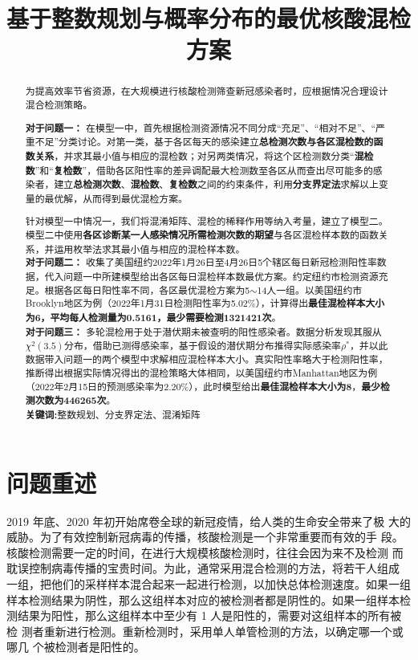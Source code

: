 \documentclass[withoutpreface,bwprint]{cumcmthesis} %
\title{基于整数规划与概率分布的最优核酸混检方案}
\begin{document}
\maketitle
\begin{abstract}

为提高效率节省资源，在大规模进行核酸检测筛查新冠感染者时，应根据情况合理设计混合检测策略。

\textbf{对于问题一：}
在模型一中，首先根据检测资源情况不同分成“充足”、“相对不足”、“严重不足”分类讨论。对第一类，基于各区每天的感染建立\textbf{总检测次数与各区混检数的函数关系}，并求其最小值与相应的混检数；对另两类情况，将这个区检测数分类“\textbf{混检数}”和“\textbf{复检数}”，借助各区阳性率的差异调配最大检测数至各区从而查出尽可能多的感染者，建立\textbf{总检测次数}、\textbf{混检数}、\textbf{复检数}之间的约束条件，利用\textbf{分支界定法}求解以上变量的最优解，从而得到最优混检方案。 

针对模型一中情况一，我们将混淆矩阵、混检的稀释作用等纳入考量，建立了模型二。模型二中使用\textbf{各区诊断某一人感染情况所需检测次数的期望}与各区混检样本数的函数关系，并运用枚举法求其最小值与相应的混检样本数。\\

\textbf{对于问题二：} 
收集了美国纽约2022年1月26日至4月26日5个辖区每日新冠检测阳性率数据，代入问题一中所建模型给出各区每日混检样本数最优方案。约定纽约市检测资源充足。根据各区每日阳性率不同，各区最优混检方案为5$\sim$14人一组。以美国纽约市Brooklyn地区为例（2022年1月31日检测阳性率为5.02\%），计算得出\textbf{最佳混检样本大小为6，平均每人检测量为0.5161，最少需要检测1321421次}。\\

\textbf{对于问题三：} 
多轮混检用于处于潜伏期未被查明的阳性感染者。数据分析发现其服从$ \chi^2  \left(3.5\right)$分布\cite{wuhan}，借助已测得感染率，基于假设的潜伏期分布推得实际感染率$\rho^*$，并以此数据带入问题一的两个模型中求解相应混检样本大小。真实阳性率略大于检测阳性率，推断得出根据实际情况得出的混检策略大体相同，以美国纽约市Manhattan地区为例（2022年2月15日的预测感染率为2.20\%），此时模型给出\textbf{最佳混检样本大小为8}，\textbf{最少检测次数为446265次}。\\

\textbf{关键词:}整数规划、分支界定法、混淆矩阵
\end{abstract}

\tableofcontents

\newpage

\section{问题重述}
2019 年底、2020 年初开始席卷全球的新冠疫情，给人类的生命安全带来了极
大的威胁。为了有效控制新冠病毒的传播，核酸检测是一个非常重要而有效的手
段。核酸检测需要一定的时间，在进行大规模核酸检测时，往往会因为来不及检测
而耽误控制病毒传播的宝贵时间。为此，通常采用混合检测的方法，将若干人组成
一组，把他们的采样样本混合起来一起进行检测，以加快总体检测速度。如果一组
样本检测结果为阴性，那么这组样本对应的被检测者都是阴性的。如果一组样本检
测结果为阳性，那么这组样本中至少有 1 人是阳性的，需要对这组样本的所有被检
测者重新进行检测。重新检测时，采用单人单管检测的方法，以确定哪一个或哪几
个被检测者是阳性的。
\end{document}
